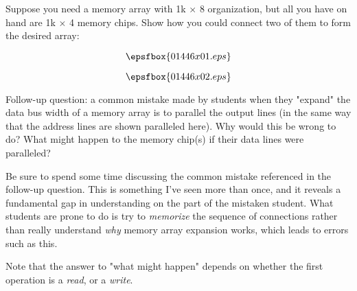 

Suppose you need a memory array with 1k $\times$ 8 organization, but all you have on hand are 1k $\times$ 4 memory chips.  Show how you could connect two of them to form the desired array:

$$\epsfbox{01446x01.eps}$$







$$\epsfbox{01446x02.eps}$$

\vskip 10pt

Follow-up question: a common mistake made by students when they "expand" the data bus width of a memory array is to parallel the output lines (in the same way that the address lines are shown paralleled here).  Why would this be wrong to do?  What might happen to the memory chip(s) if their data lines were paralleled?







Be sure to spend some time discussing the common mistake referenced in the follow-up question.  This is something I've seen more than once, and it reveals a fundamental gap in understanding on the part of the mistaken student.  What students are prone to do is try to {\it memorize} the sequence of connections rather than really understand {\it why} memory array expansion works, which leads to errors such as this.

Note that the answer to "what might happen" depends on whether the first operation is a {\it read}, or a {\it write}.





